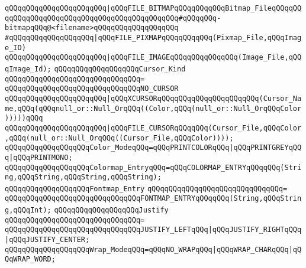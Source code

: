 \verb|qQQqqQQqqQQqqQQqqQQqqQQq|\verb#|qQQqFILE_BITMAPqQQqqQQqqQQqBitmap_FileqQQqqQQqqQQqqQQqqQQqqQQqqQQqqQQqqQQqqQQqqQQqqQQq#\verb|#qQQqqQQq-bitmapqQQq@<filename>qQQqqQQqqQQqqQQqqQQq|\newline
\verb|#qQQqqQQqqQQqqQQqqQQq|\verb#|qQQqFILE_PIXMAPqQQqqQQqqQQq(Pixmap_File,qQQqImage_ID)#\newline
\verb|qQQqqQQqqQQqqQQqqQQqqQQq|\verb#|qQQqFILE_IMAGEqQQqqQQqqQQqqQQq(Image_File,qQQqImage_Id);#\newline
\newline
\verb|qQQqqQQqqQQqqQQqqQQqCursor_Kind|\newline
\verb|qQQqqQQqqQQqqQQqqQQqqQQqqQQqqQQq=|\newline
\verb|qQQqqQQqqQQqqQQqqQQqqQQqqQQqqQQqNO_CURSOR|\newline
\verb|qQQqqQQqqQQqqQQqqQQqqQQq|\verb#|qQQqXCURSORqQQqqQQqqQQqqQQqqQQqqQQq(Cursor_Name,qQQq(qQQqnull_or::Null_OrqQQq((Color,qQQq(null_or::Null_OrqQQqColor)))))qQQq#\newline
\verb|qQQqqQQqqQQqqQQqqQQqqQQq|\verb#|qQQqFILE_CURSORqQQqqQQq(Cursor_File,qQQqColor,qQQq(null_or::Null_OrqQQq((Cursor_File,qQQqColor))));#\newline
\newline
\verb|qQQqqQQqqQQqqQQqqQQqColor_ModeqQQq=qQQqPRINTCOLORqQQq|\verb#|qQQqPRINTGREYqQQq|qQQqPRINTMONO;#\newline
\newline
\verb|qQQqqQQqqQQqqQQqqQQqColormap_EntryqQQq=qQQqCOLORMAP_ENTRYqQQqqQQq(String,qQQqString,qQQqString,qQQqString);|\newline
\newline
\verb|qQQqqQQqqQQqqQQqqQQqFontmap_Entry|\newline
\verb|qQQqqQQqqQQqqQQqqQQqqQQqqQQqqQQq=|\newline
\verb|qQQqqQQqqQQqqQQqqQQqqQQqqQQqqQQqFONTMAP_ENTRYqQQqqQQq(String,qQQqString,qQQqInt);|\newline
\newline
\verb|qQQqqQQqqQQqqQQqqQQqJustify|\newline
\verb|qQQqqQQqqQQqqQQqqQQqqQQqqQQqqQQq=|\newline
\verb|qQQqqQQqqQQqqQQqqQQqqQQqqQQqqQQqJUSTIFY_LEFTqQQq|\verb#|qQQqJUSTIFY_RIGHTqQQq|qQQqJUSTIFY_CENTER;#\newline
\newline
\verb|qQQqqQQqqQQqqQQqqQQqWrap_ModeqQQq=qQQqNO_WRAPqQQq|\verb#|qQQqWRAP_CHARqQQq|qQQqWRAP_WORD;#\newline
\newline
